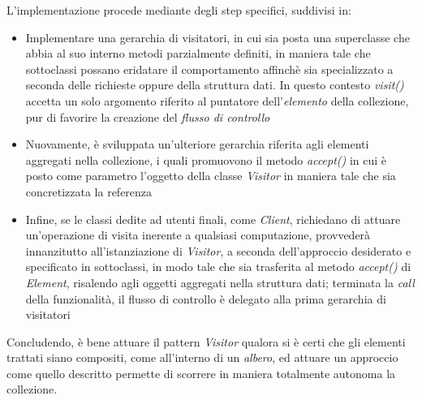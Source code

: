 \documentclass{article}
\begin{document}
L'implementazione procede mediante degli step specifici, suddivisi in:
\begin{itemize}[label={-}]
    \itemsep0em
    \item Implementare una gerarchia di visitatori, in cui sia posta una superclasse che abbia al suo interno metodi parzialmente definiti, in maniera tale che sottoclassi possano eridatare il comportamento affinchè sia specializzato a seconda delle richieste oppure della struttura dati. In questo contesto \textit{visit()} accetta un solo argomento riferito al puntatore dell'\textit{elemento} della collezione, pur di favorire la creazione del \textit{flusso di controllo}
    \item Nuovamente, è sviluppata un'ulteriore gerarchia riferita agli elementi aggregati nella collezione, i quali promuovono il metodo \textit{accept()} in cui è posto come parametro l'oggetto della classe \textit{Visitor} in maniera tale che sia concretizzata la referenza
    \item Infine, se le classi dedite ad utenti finali, come \textit{Client}, richiedano di attuare un'operazione di visita inerente a qualsiasi computazione, provvederà innanzitutto all'istanziazione di \textit{Visitor}, a seconda dell'approccio desiderato e specificato in sottoclassi, in modo tale che sia trasferita al metodo \textit{accept()} di \textit{Element}, risalendo agli oggetti aggregati nella struttura dati; terminata la \textit{call} della funzionalità, il flusso di controllo è delegato alla prima gerarchia di visitatori 
\end{itemize}
Concludendo, è bene attuare il pattern \textit{Visitor} qualora si è certi che gli elementi trattati siano compositi, come all'interno di un \textit{albero}, ed attuare un approccio come quello descritto permette di scorrere in maniera totalmente autonoma la collezione.
\end{document}
